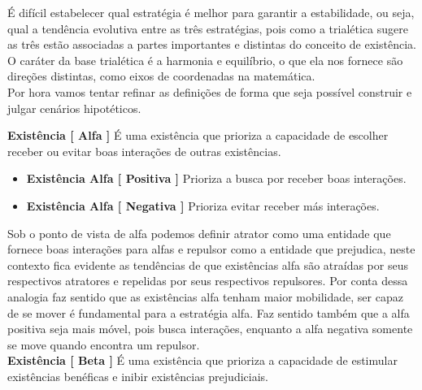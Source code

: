 \documentclass[10pt,a4paper]{report}
\begin{document}
\hspace{\baselineskip}

É difícil estabelecer qual estratégia é melhor para garantir a estabilidade, ou seja, qual a tendência evolutiva entre as três estratégias, pois como a trialética sugere as três estão associadas a partes importantes e distintas do conceito de existência. O caráter da base trialética é a harmonia e equilíbrio, o que ela nos fornece são direções distintas, como eixos de coordenadas na matemática.\\

Por hora vamos tentar refinar as definições de forma que seja possível construir e julgar cenários hipotéticos.

\hspace{\baselineskip}

\textbf{Existência [ Alfa ]} É uma existência que prioriza a capacidade de escolher receber ou evitar boas interações de outras existências.

\begin{itemize}
	\item[ (i) ] \textbf{Existência Alfa [ Positiva ]} Prioriza a busca por receber boas interações.
	\item[ (ii) ] \textbf{Existência Alfa [ Negativa ]} Prioriza evitar receber más interações.
\end{itemize}

Sob o ponto de vista de alfa podemos definir atrator como uma entidade que fornece boas interações para alfas e repulsor como a entidade que prejudica, neste contexto fica evidente as tendências de que existências alfa são atraídas por seus respectivos atratores e repelidas por seus respectivos repulsores. Por conta dessa analogia faz sentido que as existências alfa tenham maior mobilidade, ser capaz de se mover é fundamental para a estratégia alfa. Faz sentido também que a alfa positiva seja mais móvel, pois busca interações, enquanto a alfa negativa somente se move quando encontra um repulsor. \\

\textbf{Existência [ Beta ]} É uma existência que prioriza a capacidade de estimular existências benéficas e inibir existências prejudiciais.
\end{document}
